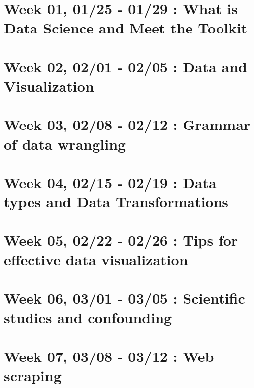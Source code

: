 \documentclass[
]{book}
\begin{document}
\hypertarget{week-01-0125---0129-what-is-data-science-and-meet-the-toolkit}{%
\section{Week 01, 01/25 - 01/29 : What is Data Science and Meet the Toolkit}\label{week-01-0125---0129-what-is-data-science-and-meet-the-toolkit}}

\hypertarget{week-02-0201---0205-data-and-visualization}{%
\section{Week 02, 02/01 - 02/05 : Data and Visualization}\label{week-02-0201---0205-data-and-visualization}}

\hypertarget{week-03-0208---0212-grammar-of-data-wrangling}{%
\section{Week 03, 02/08 - 02/12 : Grammar of data wrangling}\label{week-03-0208---0212-grammar-of-data-wrangling}}

\hypertarget{week-04-0215---0219-data-types-and-data-transformations}{%
\section{Week 04, 02/15 - 02/19 : Data types and Data Transformations}\label{week-04-0215---0219-data-types-and-data-transformations}}

\hypertarget{week-05-0222---0226-tips-for-effective-data-visualization}{%
\section{Week 05, 02/22 - 02/26 : Tips for effective data visualization}\label{week-05-0222---0226-tips-for-effective-data-visualization}}

\hypertarget{week-06-0301---0305-scientific-studies-and-confounding}{%
\section{Week 06, 03/01 - 03/05 : Scientific studies and confounding}\label{week-06-0301---0305-scientific-studies-and-confounding}}

\hypertarget{week-07-0308---0312-web-scraping}{%
\section{Week 07, 03/08 - 03/12 : Web scraping}\label{week-07-0308---0312-web-scraping}}
\end{document}
